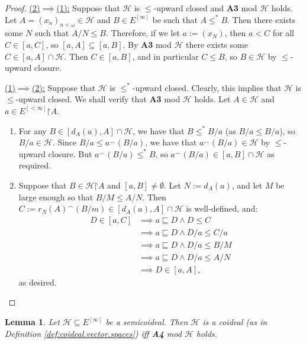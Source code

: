 \documentclass[10pt,a4paper]{amsart}
\theoremstyle{plain}
\numberwithin{equation}{section}
\newtheorem{lemma}[theorem]{Lemma}
\theoremstyle{definition}
\newcommand{\cal}{\mathcal}
\newcommand{\restrictedto}{\mathord{\upharpoonright}}
\renewcommand{\H}{\cal{H}}
\begin{document}
\begin{proof}
    \underline{(2)$\implies$(1):} Suppose that $\H$ is $\leq$-upward closed and \textbf{A3} mod $\H$ holds. Let $A = (x_n)_{n<\omega} \in \H$ and $B \in E^{[\infty]}$ be such that $A \leq^* B$. Then there exists some $N$ such that $A/N \leq B$. Therefore, if we let $a := (x_N)$, then $a < C$ for all $C \in [a,C]$, so $[a,A] \subseteq [a,B]$. By \textbf{A3} mod $\H$ there exists some $C \in [a,A] \cap \H$. Then $C \in [a,B]$, and in particular $C \leq B$, so $B \in \H$ by $\leq$-upward closure. 
    
    \underline{(1)$\implies$(2):} Suppose that $\H$ is $\leq^*$-upward closed. Clearly, this implies that $\H$ is $\leq$-upward closed. We shall verify that \textbf{A3} mod $\H$ holds. Let $A \in \H$ and $a \in E^{[<\infty]}\restrictedto A$.
    \begin{enumerate}[label=(\alph*)]
        \item For any $B \in [d_A(a),A] \cap \H$, we have that $B \leq^* B/a$ (as $B/a \leq B/a$), so $B/a \in \H$. Since $B/a \leq a^\frown(B/a)$, we have that $a^\frown(B/a) \in \H$ by $\leq$-upward closure. But $a^\frown(B/a) \leq^* B$, so $a^\frown(B/a) \in [a,B] \cap \H$ as required.

        \item Suppose that $B \in \H\restrictedto A$ and $[a,B] \neq \emptyset$. Let $N := d_A(a)$, and let $M$ be large enough so that $B/M \leq A/N$. Then $C := r_N(A)^\frown(B/m) \in [d_A(a),A] \cap \H$ is well-defined, and:
        \begin{align*}
            D \in [a,C] &\implies a \sqsubseteq D \wedge D \leq C \\
            &\implies a \sqsubseteq D \wedge D/a \leq C/a \\
            &\implies a \sqsubseteq D \wedge D/a \leq B/M \\
            &\implies a \sqsubseteq D \wedge D/a \leq A/N \\
            &\implies D \in [a,A], 
        \end{align*}
        as desired.
    \end{enumerate}
\end{proof}

\begin{lemma}
    Let $\H \subseteq E^{[\infty]}$ be a semicoideal. Then $\H$ is a coideal (as in Definition \ref{def:coideal.vector.spaces}) iff \textbf{A4} mod $\H$ holds.
\end{lemma}
\end{document}
